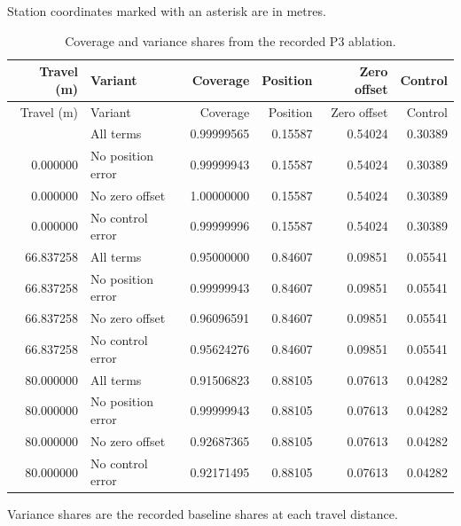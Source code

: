\noindent Station coordinates marked with an asterisk are in metres.\par
{}
\begin{longtable}{@{}rlrrrr@{}}
\caption{Coverage and variance shares from the recorded P3 ablation.}\\
\toprule
Travel (m) & Variant & Coverage & Position & Zero offset & Control\\
\midrule
\endfirsthead
\toprule
Travel (m) & Variant & Coverage & Position & Zero offset & Control\\
\midrule
\endhead
\bottomrule
\endlastfoot
0.000000 & All terms & 0.99999565 & 0.15587 & 0.54024 & 0.30389\\
0.000000 & No position error & 0.99999943 & 0.15587 & 0.54024 & 0.30389\\
0.000000 & No zero offset & 1.00000000 & 0.15587 & 0.54024 & 0.30389\\
0.000000 & No control error & 0.99999996 & 0.15587 & 0.54024 & 0.30389\\
66.837258 & All terms & 0.95000000 & 0.84607 & 0.09851 & 0.05541\\
66.837258 & No position error & 0.99999943 & 0.84607 & 0.09851 & 0.05541\\
66.837258 & No zero offset & 0.96096591 & 0.84607 & 0.09851 & 0.05541\\
66.837258 & No control error & 0.95624276 & 0.84607 & 0.09851 & 0.05541\\
80.000000 & All terms & 0.91506823 & 0.88105 & 0.07613 & 0.04282\\
80.000000 & No position error & 0.99999943 & 0.88105 & 0.07613 & 0.04282\\
80.000000 & No zero offset & 0.92687365 & 0.88105 & 0.07613 & 0.04282\\
80.000000 & No control error & 0.92171495 & 0.88105 & 0.07613 & 0.04282\\
\end{longtable}
\noindent Variance shares are the recorded baseline shares at each travel distance.\par
{}
